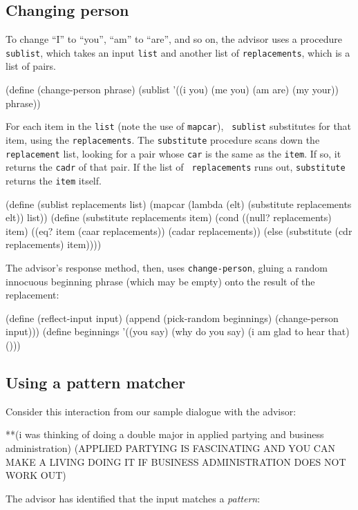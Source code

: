 \subsection{Changing person}

To change ``I'' to ``you'', ``am'' to ``are'', and so on, the advisor
uses a procedure {\tt sublist}, which takes an input {\tt list} and
another list of {\tt replacements}, which is a list of pairs.

\beginlisp
(define (change-person phrase)
  (sublist '((i you) (me you) (am are) (my your))
           phrase))
\endlisp

\noindent
For each item in the {\tt list} (note the use of {\tt mapcar}), {\tt
sublist} substitutes for that item, using the {\tt replacements}.  The
{\tt substitute} procedure scans down the {\tt replacement} list,
looking for a pair whose {\tt car} is the same as the {\tt item}.  If
so, it returns the {\tt cadr} of that pair.  If the list of {\tt
replacements} runs out, {\tt substitute} returns the {\tt item}
itself.

\beginlisp
(define (sublist replacements list)
  (mapcar (lambda (elt) (substitute replacements elt))
          list))
\null
(define (substitute replacements item)
  (cond ((null? replacements) item)
        ((eq? item (caar replacements)) (cadar replacements))
        (else (substitute (cdr replacements) item))))
\endlisp

The advisor's response method, then, uses {\tt change-person}, gluing
a random innocuous beginning phrase (which may be empty) onto the
result of the replacement:

\beginlisp
(define (reflect-input input)
  (append (pick-random beginnings) (change-person input)))
\null
(define beginnings
  '((you say)
    (why do you say)
    (i am glad to hear that)
    ()))
\endlisp

\pagebreak

\subsection{Using a pattern matcher}

Consider this interaction from our sample dialogue with the advisor:

\beginlisp
**(i was thinking of doing a double major in
   applied partying and business administration)
(APPLIED PARTYING IS FASCINATING AND YOU CAN MAKE A LIVING DOING IT
   IF BUSINESS ADMINISTRATION DOES NOT WORK OUT)
\endlisp

The advisor has identified that the input matches a {\em pattern}:

